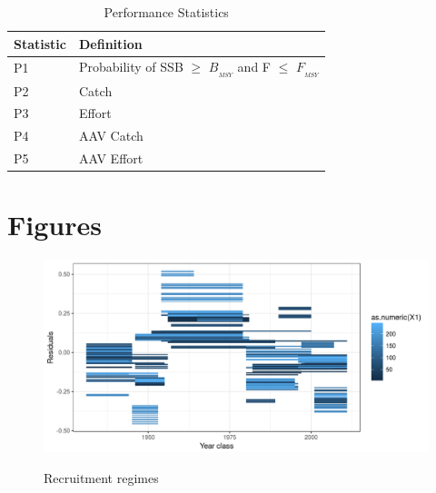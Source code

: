 \documentclass[%
nonumbib,      %
%
]{nrc1}                          %
\begin{document}
\begin{table}[h!]
  \label{tab:measures}
  \caption{Performance Statistics}  
  \begin{center}
    \begin{tabular}{ l p{10cm} }
    \hline 
    Statistic & Definition \\ 
    \hline 
    P1   & Probability of SSB $\geq$ $B_{_{MSY}}$ and F $\le$  $F_{_{MSY}}$ \\ 
    P2   & Catch\\ 
    P3   & Effort\\ 
    P4   & AAV Catch  \\ 
    P5   & AAV Effort  \\ 
    \hline 
    \end{tabular}
  \end{center}
\end{table}
 

\newpage\clearpage
\section*{Figures}

\begin{figure}[htbp]
\centering
\includegraphics[width=6in]{om-regime.png}
\label{fig:regime}
\caption{Recruitment regimes}
\end{figure}
\end{document}
